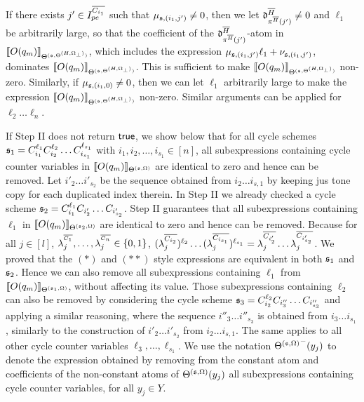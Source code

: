 If there exists $j' \in I^{\overline{C_{i_1}}}_{pe}$ such that $\mu_{{\mathfrak{s} },(i_1,j')} \neq 0$, then we let $\mathfrak{d}^{\overline{H}}_{\pi^{\overline{H}}(j')} \neq 0$ and $\ell_1$ be arbitrarily large, so that the coefficient of the  $\mathfrak{d}^{\overline{H}}_{\pi^{\overline{H}}(j')}$-atom in $\llbracket O(q_m)\rrbracket_{\Theta^{({\mathfrak{s} },\Theta^{(H,\Omega_\bot)})}}$, which includes the expression $\mu_{{\mathfrak{s} }, (i_1,j')} \ell_1 + \nu_{{\mathfrak{s} }, (i_1,j')}$, dominates $\llbracket O(q_m)\rrbracket_{\Theta^{({\mathfrak{s} },\Theta^{(H,\Omega_\bot)})}}$. This is sufficient to make $\llbracket O(q_m)\rrbracket_{\Theta^{({\mathfrak{s} },\Theta^{(H,\Omega_\bot)})}}$ non-zero. Similarly, if $\mu_{{\mathfrak{s} },(i_1,0)} \neq 0$, then we can let $\ell_1$ arbitrarily large to make the expression $\llbracket O(q_m)\rrbracket_{\Theta^{({\mathfrak{s} },\Theta^{(H,\Omega_\bot)})}}$ non-zero.
Similar arguments can be applied for $\ell_2\dots\ell_n$.

If Step II does not return $\mathsf{true}$, we show below that for all cycle schemes ${\mathfrak{s} }_1=C_{i_1}^{\ell_1} C_{i_2}^{\ell_2} \dots C_{i_{s_1}}^{\ell_{s_1}}$ with $i_1,i_2,\dots,i_{s_1} \in [n]$, all subexpressions containing cycle counter variables in $\llbracket O(q_m)\rrbracket_{\Theta^{({\mathfrak{s} },\Omega)}}$ are identical to zero and hence can be removed. Let ${i'_2} \dots {i'_{s_2}}$ be the sequence obtained from $i_2 \dots i_{s,1}$ by keeping jus tone copy for each duplicated index therein.  
In Step II we already checked a cycle scheme ${\mathfrak{s} }_2=C_{i_1}^{\ell_1} C_{i'_2} \dots C_{i'_{s_2}}$. Step II guarantees that all subexpressions containing $\ell_1$ in 
$\llbracket O(q_m)\rrbracket_{\Theta^{({\mathfrak{s} }_2,\Omega)}}$ are identical to zero and hence can be removed.
Because for all $j\in[l]$, $\lambda^{^{\overline{C_1}}}_j, \dots, \lambda^{^{\overline{C_n}}}_j \in \{0,1\}$,   $(\lambda^{\overline{C_{i_2}}}_{j})^{\ell_2} \dots (\lambda^{\overline{C_{i_{s_1}}}}_{j})^{\ell_{s_1}} = \lambda^{\overline{C_{i'_2}}}_{j} \dots \lambda^{\overline{C_{i'_{s_2}}}}_{j}$. We proved that the $(\ast)$ and $(\ast\ast)$ style expressions are equivalent in both ${\mathfrak{s} }_1$ and ${\mathfrak{s} }_2$.
Hence we can also remove all subexpressions containing $\ell_1$ from  $\llbracket O(q_m)\rrbracket_{\Theta^{({\mathfrak{s} }_1,\Omega)}}$, without affecting its value.
Those subexpressions containing $\ell_2$ can also be removed by considering the cycle scheme ${\mathfrak{s} }_3=C_{i_2}^{\ell_2} C_{i''_3} \dots C_{i''_{s_3}}$ and applying a similar reasoning, where the sequence ${i''_3} \dots {i''_{s_3}}$ is obtained from ${i_3} \dots  i_{s_1}$, similarly to the construction of ${i'_2} \dots {i'_{s_2}}$ from $i_2 \dots i_{s,1}$. The same applies to all other cycle counter variables $\ell_3,\dots,\ell_{s_1}$.
We use the notation ${\Theta^{({\mathfrak{s} },\Omega)}}^-(y_j)$ to denote the expression obtained by removing from the constant atom and coefficients of the non-constant atoms of $\Theta^{({\mathfrak{s} },\Omega)}(y_j)$ all subexpressions containing cycle counter variables, for all $y_j \in Y$. 


